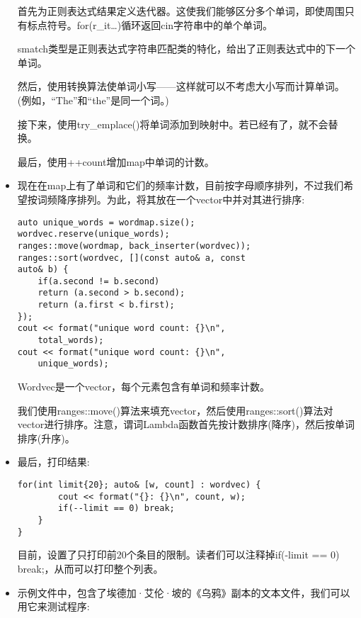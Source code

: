 \begin{itemize}
首先为正则表达式结果定义迭代器。这使我们能够区分多个单词，即使周围只有标点符号。for(r\_it…)循环返回cin字符串中的单个单词。

smatch类型是正则表达式字符串匹配类的特化，给出了正则表达式中的下一个单词。

然后，使用转换算法使单词小写——这样就可以不考虑大小写而计算单词。(例如，“The”和“the”是同一个词。)

接下来，使用try\_emplace()将单词添加到映射中。若已经有了，就不会替换。

最后，使用++count增加map中单词的计数。

\item 
现在在map上有了单词和它们的频率计数，目前按字母顺序排列，不过我们希望按词频降序排列。为此，将其放在一个vector中并对其进行排序:

\begin{lstlisting}[style=styleCXX]
auto unique_words = wordmap.size();
wordvec.reserve(unique_words);
ranges::move(wordmap, back_inserter(wordvec));
ranges::sort(wordvec, [](const auto& a, const
auto& b) {
	if(a.second != b.second)
	return (a.second > b.second);
	return (a.first < b.first);
});
cout << format("unique word count: {}\n",
	total_words);
cout << format("unique word count: {}\n",
	unique_words);
\end{lstlisting}

Wordvec是一个vector，每个元素包含有单词和频率计数。

我们使用ranges::move()算法来填充vector，然后使用ranges::sort()算法对vector进行排序。注意，谓词Lambda函数首先按计数排序(降序)，然后按单词排序(升序)。

\item 
最后，打印结果:

\begin{lstlisting}[style=styleCXX]
	for(int limit{20}; auto& [w, count] : wordvec) {
		cout << format("{}: {}\n", count, w);
		if(--limit == 0) break;
	}
}
\end{lstlisting}

目前，设置了只打印前20个条目的限制。读者们可以注释掉if(-limit == 0) break;，从而可以打印整个列表。

\item 
示例文件中，包含了埃德加·艾伦·坡的《乌鸦》副本的文本文件，我们可以用它来测试程序:


\end{itemize}

